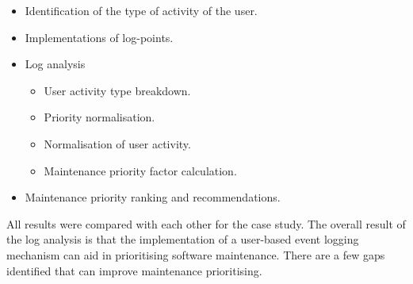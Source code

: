 \begin{itemize}
	\item Identification of the type of activity of the user.
	\item Implementations of log-points.
	\item Log analysis
		\begin{itemize}
			\item User activity type breakdown.
			\item Priority normalisation.
			\item Normalisation of user activity.
			\item Maintenance priority factor calculation.
		\end{itemize}
	\item Maintenance priority ranking and recommendations. 
\end{itemize}

All results were compared with each other for the case study. The overall result of the log analysis is that the implementation of a user-based event logging mechanism can aid in prioritising software maintenance. There are a few gaps identified that can improve maintenance prioritising.
